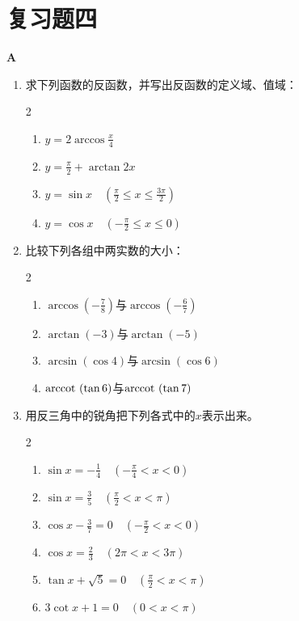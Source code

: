 \section*{复习题四}

\begin{center}
\bfseries A
\end{center}

\begin{enumerate}
    \item 求下列函数的反函数，并写出反函数的定义域、值域：
\begin{multicols}{2}
\begin{enumerate}[(1)]
    \item $y=2\arccos\frac{x}{4}$
    \item $y=\frac{\pi}{2}+\arctan 2x$
    \item $y=\sin x\quad \left(\frac{\pi}{2}\le x\le \frac{3\pi}{2}\right)$
    \item $y=\cos x\quad \left(-\frac{\pi}{2}\le x\le 0\right)$
\end{enumerate}
\end{multicols}

\item 比较下列各组中两实数的大小：
\begin{multicols}{2}
\begin{enumerate}[(1)]
    \item $\arccos\left(-\frac{7}{8}\right)$与$\arccos\left(-\frac{6}{7}\right)$
    \item $\arctan\left(-3\right)$与$\arctan\left(-5\right)$
    \item $\arcsin\left(\cos 4\right)$与$\arcsin\left(\cos 6\right)$
    \item ${\rm arccot\,}\left(\tan 6\right)$与${\rm arccot\,}\left(\tan {7}\right)$
\end{enumerate}
\end{multicols}

\item 用反三角中的锐角把下列各式中的$x$表示出来。
\begin{multicols}{2}
\begin{enumerate}[(1)]
    \item $\sin x=-\frac{1}{4}\quad \left(-\frac{\pi}{4}<x<0\right)$
    \item $\sin x=\frac{3}{5}\quad \left(\frac{\pi}{2}<x<\pi\right)$
    \item $\cos x-\frac{3}{7}=0\quad \left(-\frac{\pi}{2}<x<0\right)$
    \item $\cos x=\frac{2}{3}\quad \left(2\pi<x<3\pi\right)$
    \item $\tan x+\sqrt{5}=0\quad \left(\frac{\pi}{2}<x<\pi\right)$
    \item $3\cot x+1=0\quad \left(0<x<\pi\right)$
\end{enumerate}
\end{multicols}


\end{enumerate}
